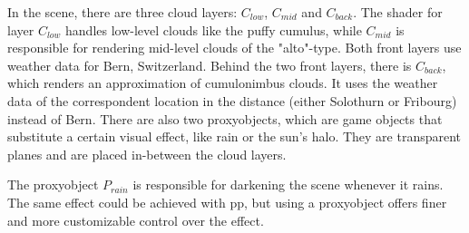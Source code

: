 \begin{figure}[H]
    \centering
    \label{img:tikz:techimpl:anatomy}
\end{figure}

\noindent
In the scene, there are three cloud layers: \color{red}$C_{low}$\color{black}, \color{red}$C_{mid}$ \color{black} and \color{red}$C_{back}$\color{black}.
The \gls{shader} for layer \color{red}$C_{low}$ \color{black} handles low-level clouds like the puffy cumulus, while \color{red}$C_{mid}$ \color{black} is responsible for rendering mid-level clouds of the "alto"-type.
Both front layers use weather data for Bern, Switzerland.
Behind the two front layers, there is \color{red}$C_{back}$\color{black}, which renders an approximation of cumulonimbus clouds. It uses the weather data of the correspondent location in the distance (either Solothurn or Fribourg) instead of Bern.
\emptyline
There are also two \gls{proxyobject}s, which are game objects that substitute a certain visual effect, like rain or the sun's halo.
They are transparent planes and are placed in-between the cloud layers.

\clearpage

\noindent
The \gls{proxyobject} \color{darkercyan}$P_{rain}$ \color{black} is responsible for darkening the scene whenever it rains.
The same effect could be achieved with \gls{pp}, but using a \gls{proxyobject} offers finer and more customizable control over the effect.

